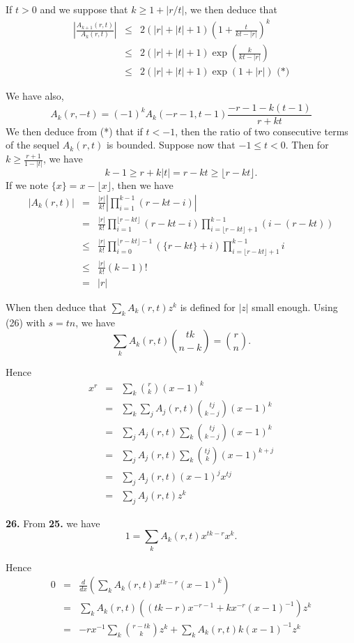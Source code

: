 \documentclass[a4paper,12pt]{article}
\newcommand{\newpar}[1]{\bigskip \noindent \textbf{#1.}}
\begin{document}
If $t > 0$ and we suppose that $k \ge 1 + |r/t|$, we then deduce that
\begin{eqnarray*}
  \left| \frac{A_{k+1}(r,t)}{A_k(r,t)}\right| &\le& 2(|r|+|t|+1)
  \left(1 + \frac{t}{kt-|r|}\right)^k \\
  &\le& 2(|r|+|t|+1) \exp\left(\frac{k}{kt-|r|}\right) \\
  &\le& 2(|r|+|t|+1) \exp(1 + |r|) \mbox{ (*)}
\end{eqnarray*}

We have also,
\[ A_k(r,-t) = (-1)^k A_k(-r-1,t-1) \frac{-r-1-k(t-1)}{r+kt}\]
We then deduce from (*) that if $t < -1$, then the ratio of two
consecutive terms of the sequel $A_k(r,t)$ is bounded.  Suppose now
that $-1 \le t < 0$. Then for $k \ge \frac{r+1}{1-|t|}$, we have
\[ k-1 \ge r+k|t| = r-kt \ge \lfloor r-kt\rfloor.\]
If we note $\{x\} = x - \lfloor x\rfloor$, then we have
\begin{eqnarray*}
  |A_k(r,t)| &=& \frac{|r|}{k!} \left| \prod_{i=1}^{k-1} (r-kt -i)
  \right| \\
  &=&  \frac{|r|}{k!} \prod_{i=1}^{\lfloor r-kt\rfloor}(r-kt -i)
  \prod_{i=\lfloor r-kt\rfloor + 1}^{k-1}(i-(r-kt)) \\
  &\le& \frac{|r|}{k!} \prod_{i=0}^{\lfloor r-kt\rfloor-1}(\{r-kt\} +
  i) \prod_{i=\lfloor r-kt\rfloor +1}^{k-1} i \\
  &\le& \frac{|r|}{k!} (k-1)! \\
  &=& |r|
\end{eqnarray*}

When then deduce that $\sum_k A_k(r,t) z^k$ is defined for $|z|$ small
enough.  Using (26) with $s = tn$, we have
\[ \sum_k A_k(r,t) {{tk} \choose {n-k}} = {r \choose n}.\]

Hence
\begin{eqnarray*}
  x^r &=& \sum_k {r \choose k} (x-1)^k \\
  &=& \sum_k \sum_j A_j(r,t) {{tj} \choose {k-j}} (x-1)^k \\
  &=& \sum_j A_j(r,t) \sum_k {{tj} \choose {k-j}} (x-1)^k \\
  &=& \sum_j A_j(r,t) \sum_k {{tj} \choose k} (x-1)^{k+j} \\
  &=& \sum_j A_j(r,t) (x-1)^j x^{tj} \\
  &=& \sum_j A_j(r,t) z^k
\end{eqnarray*}

\newpar{26} From \textbf{25.} we have
\[ 1 = \sum_k A_k(r,t) x^{tk-r}x^k.\]

Hence
\begin{eqnarray*}
  0 &=& \frac{d}{dx} \left( \sum_k A_k(r,t) x^{tk-r}(x-1)^k \right) \\
  &=& \sum_k A_k(r,t) ((tk-r) x^{-r-1} + k x^{-r}(x-1)^{-1}) z^k \\
  &=& - r x^{-1} \sum_k {{r-tk} \choose k} z^k + \sum_k A_k(r,t) k
  (x-1)^{-1} z^k \\
\end{eqnarray*}
\end{document}

